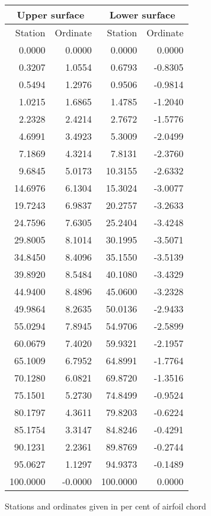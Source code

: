 \documentclass[11pt]{book}
\begin{document}
 \hspace{4mm}
 \begin{tabular}{|r|r|r|r|} \hline 
 \multicolumn{2}{|c|}{Upper surface} & \multicolumn{2}{|c|}{Lower surface} \\
 \hline
 Station & Ordinate & Station & Ordinate \\
 \hline
0.0000 & 0.0000 & 0.0000 & 0.0000 \\
0.3207 & 1.0554 & 0.6793 & -0.8305 \\
0.5494 & 1.2976 & 0.9506 & -0.9814 \\
1.0215 & 1.6865 & 1.4785 & -1.2040 \\
2.2328 & 2.4214 & 2.7672 & -1.5776 \\
4.6991 & 3.4923 & 5.3009 & -2.0499 \\
7.1869 & 4.3214 & 7.8131 & -2.3760 \\
9.6845 & 5.0173 & 10.3155 & -2.6332 \\
14.6976 & 6.1304 & 15.3024 & -3.0077 \\
19.7243 & 6.9837 & 20.2757 & -3.2633 \\
24.7596 & 7.6305 & 25.2404 & -3.4248 \\
29.8005 & 8.1014 & 30.1995 & -3.5071 \\
34.8450 & 8.4096 & 35.1550 & -3.5139 \\
39.8920 & 8.5484 & 40.1080 & -3.4329 \\
44.9400 & 8.4896 & 45.0600 & -3.2328 \\
49.9864 & 8.2635 & 50.0136 & -2.9433 \\
55.0294 & 7.8945 & 54.9706 & -2.5899 \\
60.0679 & 7.4020 & 59.9321 & -2.1957 \\
65.1009 & 6.7952 & 64.8991 & -1.7764 \\
70.1280 & 6.0821 & 69.8720 & -1.3516 \\
75.1501 & 5.2730 & 74.8499 & -0.9524 \\
80.1797 & 4.3611 & 79.8203 & -0.6224 \\
85.1754 & 3.3147 & 84.8246 & -0.4291 \\
90.1231 & 2.2361 & 89.8769 & -0.2744 \\
95.0627 & 1.1297 & 94.9373 & -0.1489 \\
100.0000 & -0.0000 & 100.0000 & 0.0000 \\
 \hline 
 \end{tabular}
 \vspace{8mm}

Stations and ordinates given in per cent of airfoil chord
\end{document}
